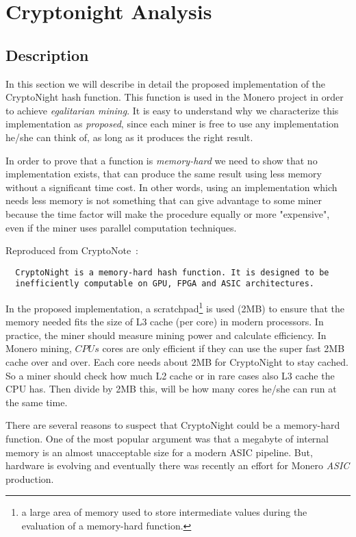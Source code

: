 \chapter*{Cryptonight Analysis}
%
%
\setcounter{section}{0}
\section{Description}
In this section we will describe in detail the proposed implementation of the CryptoNight hash function. This function is used in the Monero project in order to achieve \emph{egalitarian mining}. It is easy to understand why we characterize this implementation as \emph{proposed}, since each miner is free to use any implementation he/she can think of, as long as it produces the right result.

In order to prove that a function is \emph{memory-hard} we need to show that no implementation exists, that can produce the same result using less memory without a significant time cost. In other words, using an implementation which needs less memory is not something that can give advantage to some miner because the time factor will make the procedure equally or more "expensive", even if the miner uses parallel computation techniques.

\noindent Reproduced from CryptoNote~\cite{cryptonight}:
\begin{verbatim}
  CryptoNight is a memory-hard hash function. It is designed to be
  inefficiently computable on GPU, FPGA and ASIC architectures.
\end{verbatim}
In the proposed implementation, a scratchpad\footnote{a large area of memory used to store intermediate values during the evaluation of a memory-hard function.} is used (2MB) to ensure that the memory needed fits the size of L3 cache (per core) in modern processors. In practice, the miner should measure mining power and calculate efficiency. In Monero mining, $CPUs$ cores are only efficient if they can use the super fast 2MB cache over and over. Each core needs about 2MB for CryptoNight to stay cached. So a miner should check how much L2 cache or in rare cases also L3 cache the CPU has. Then divide by 2MB this, will be how many cores he/she can run at the same time.

There are several reasons to suspect that CryptoNight could be a memory-hard function. One of the most popular argument was that a megabyte of internal memory is an almost unacceptable size for a modern ASIC pipeline. But, hardware is evolving and eventually there was recently an effort for Monero \emph{ASIC} production.

